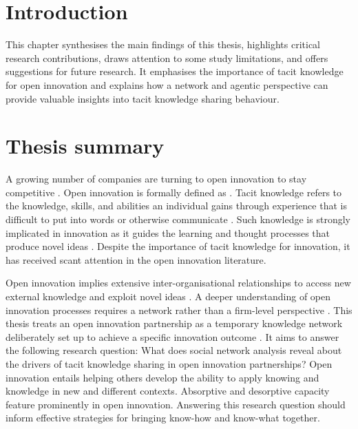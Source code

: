 
\section{Introduction}

This chapter synthesises the main findings of this thesis, highlights critical research contributions, draws attention to some study limitations, and offers suggestions for future research. It emphasises the importance of tacit knowledge for open innovation and explains how a network and agentic perspective can provide valuable insights into tacit knowledge sharing behaviour.  

\section{Thesis summary}

A growing number of companies are turning to open innovation to stay competitive \citep{stanko2017under}. Open innovation is formally defined as  \citep[][pg.~17]{chesbrough2014explicating}. Tacit knowledge refers to the knowledge, skills, and abilities an individual gains through experience that is difficult to put into words or otherwise communicate \citep{kreutz2014catalyzing}. Such knowledge is strongly implicated in innovation as it guides the learning and thought processes that produce novel ideas \citep{leonard1998role,lam2000tacit}. Despite the importance of tacit knowledge for innovation, it has received scant attention in the open innovation literature. \medskip

Open innovation implies extensive inter-organisational relationships to access new external knowledge and exploit novel ideas \citep{chiaroni2011open}. A deeper understanding of open innovation processes requires a network rather than a firm-level perspective \citep{fichter2009innovation,martinez2014analysis,yun2016network}. This thesis treats an open innovation partnership as a temporary knowledge network deliberately set up to achieve a specific innovation outcome \citep{turner2003natureoftheproject,perez2013temporary,terhorst2018tacit}. It aims to answer the following research question: What does social network analysis reveal about the drivers of tacit knowledge sharing in open innovation partnerships? Open innovation entails helping others develop the ability to apply knowing and knowledge in new and different contexts. Absorptive and desorptive capacity feature prominently in open innovation. Answering this research question should inform effective strategies for bringing know-how and know-what together. \medskip

